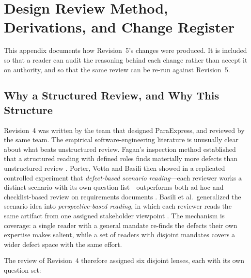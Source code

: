 \appendices

\section{Design Review Method, Derivations, and Change Register}

This appendix documents how Revision~5's changes were produced. It is included so that a reader can audit the reasoning behind each change rather than accept it on authority, and so that the same review can be re-run against Revision~5.

\subsection{Why a Structured Review, and Why This Structure}

Revision~4 was written by the team that designed ParaExpress, and reviewed by the same team. The empirical software-engineering literature is unusually clear about what beats unstructured review. Fagan's inspection method established that a structured reading with defined roles finds materially more defects than unstructured review \cite{fagan1976}. Porter, Votta and Basili then showed in a replicated controlled experiment that \emph{defect-based scenario reading}---each reviewer works a distinct scenario with its own question list---outperforms both ad hoc and checklist-based review on requirements documents \cite{porter1995}. Basili et al.\ generalized the scenario idea into \emph{perspective-based reading}, in which each reviewer reads the same artifact from one assigned stakeholder viewpoint \cite{basili1996}. The mechanism is coverage: a single reader with a general mandate re-finds the defects their own expertise makes salient, while a set of readers with disjoint mandates covers a wider defect space with the same effort.

The review of Revision~4 therefore assigned six disjoint lenses, each with its own question set:

